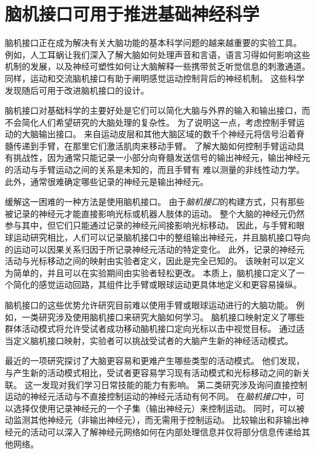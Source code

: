 \section{脑机接口可用于推进基础神经科学}

脑机接口正在成为解决有关大脑功能的基本科学问题的越来越重要的实验工具。
例如，人工耳蜗让我们深入了解大脑如何处理声音和言语，语言习得如何影响这些机制的发展，以及神经可塑性如何让大脑解释一些携带贫乏听觉信息的刺激通道。
同样，运动和交流脑机接口有助于阐明感觉运动控制背后的神经机制。
这些科学发现随后可用于改进脑机接口的设计。


脑机接口对基础科学的主要好处是它们可以简化大脑与外界的输入和输出接口，而不会简化人们希望研究的大脑处理的复杂性。
为了说明这一点，考虑控制手臂运动的大脑输出接口。
来自运动皮层和其他大脑区域的数千个神经元将信号沿着脊髓传递到手臂，在那里它们激活肌肉来移动手臂。
了解大脑如何控制手臂运动具有挑战性，因为通常只能记录一小部分向脊髓发送信号的输出神经元，输出神经元的活动与手臂运动之间的关系是未知的，而且手臂有 难以测量的非线性动力学。
此外，通常很难确定哪些记录的神经元是输出神经元。


缓解这一困难的一种方法是使用脑机接口。
由于\textit{脑机接口}的构建方式，只有那些被记录的神经元才能直接影响光标或机器人肢体的运动。
整个大脑的神经元仍然参与其中，但它们只能通过记录的神经元间接影响光标移动。
因此，与手臂和眼球运动研究相比，人们可以记录脑机接口中的整组输出神经元，并且脑机接口导向的运动可以因果关系归因于所记录神经元活动的特定变化。
此外，记录的神经元活动与光标移动之间的映射由实验者定义，因此是完全已知的。
该映射可以定义为简单的，并且可以在实验期间由实验者轻松更改。
本质上，脑机接口定义了一个简化的感觉运动回路，其组件比手臂或眼球运动更具体地定义和更容易操纵。


脑机接口的这些优势允许研究目前难以使用手臂或眼球运动进行的大脑功能。
例如，一类研究涉及使用脑机接口来研究大脑如何学习。 
脑机接口映射定义了哪些群体活动模式将允许受试者成功移动脑机接口定向光标以击中视觉目标。
通过适当定义脑机接口映射，实验者可以挑战受试者的大脑产生新的神经活动模式。


最近的一项研究探讨了大脑更容易和更难产生哪些类型的活动模式。
他们发现，与产生新的活动模式相比，受试者更容易学习现有活动模式和光标移动之间的新关联。
这一发现对我们学习日常技能的能力有影响。
第二类研究涉及询问直接控制运动的神经元活动与不直接控制运动的神经元活动有何不同。
在\textit{脑机接口}中，可以选择仅使用记录神经元的一个子集（输出神经元）来控制运动。
同时，可以被动监测其他神经元（非输出神经元），而无需用于控制运动。
比较输出和非输出神经元的活动可以深入了解神经元网络如何在内部处理信息并仅将部分信息传递给其他网络。


